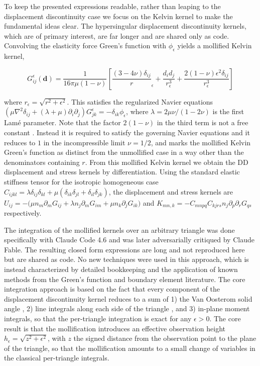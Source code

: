\documentclass[12pt]{article}
\newcommand{\ve}[1]{\mathbf{#1}}
\newcommand{\eps}{\epsilon}
\newcommand{\Req}{r_{\eps}}
\newcommand{\del}{\delta}
\begin{document}
To keep the presented expressions readable, rather than leaping to the displacement discontinuity case we focus on the Kelvin kernel to make the fundamental ideas clear.  The hypersingular displacement discontinuity kernels, which are of primary interest, are far longer and are shared only as code.  Convolving the elasticity force Green's function with $\phi_\eps$ yields a mollified Kelvin kernel,

\begin{equation}
  G_{ij}^\eps(\ve d)
    = \frac{1}{16\pi\mu(1-\nu)}
      \left[ \frac{(3-4 \nu) \del_{ij}} \Req
           + \frac{d_i d_j}{\Req^3}
           + \frac{2(1-\nu) \eps^2 \del_{ij}}{\Req^3} \right]
\end{equation}

where $\Req=\sqrt{r^2+\eps^2}$.  This satisfies the regularized Navier equations $(\mu\nabla^{2}\del_{ij} + (\lambda+\mu)\partial_i\partial_j) G^{\eps}_{jk} = -\del_{ik} \phi_\eps$, where $\lambda = 2\mu\nu/(1-2\nu)$ is the first Lam\'e parameter. Note that the factor $2(1-\nu)$ in the third term is not a free constant \citep{CortezFauciMedovikov2005}. Instead it is required to satisfy the governing Navier equations and it reduces to $1$ in the incompressible limit $\nu=1/2$, and marks the mollified Kelvin Green's function as distinct from the unmollified case in a way other than the denominators containing $r$.  From this mollified Kelvin kernel we obtain the DD displacement and stress kernels by differentiation. Using the standard elastic stiffness tensor for the isotropic homogeneous case $C_{ijkl}=\lambda\del_{ij}\del_{kl}+\mu(\del_{ik}\del_{jl}+\del_{il}\del_{jk})$, the displacement and stress kernels are $U_{ij} = -\bigl( \mu n_m \partial_m G_{ij} + \lambda n_j \partial_m G_{im} + \mu n_k \partial_j G_{ik} \bigr)$ and $K_{mn,k} = -C_{mnpq} C_{kjrs}n_j \partial_p \partial_r G_{qs}$ respectively. 

The integration of the mollified kernels over an arbitrary triangle was done specifically with Claude Code 4.6 and was later adversarially critiqued by Claude Fable.  The resulting closed form expressions are long and not reproduced here but are shared as code.  No new techniques were used in this approach, which is instead characterized by detailed bookkeeping and the application of known methods from the Green's function and boundary element literature.  The core integration approach is based on the fact that every component of the displacement discontinuity kernel reduces to a sum of 1) the Van Oosterom solid angle \citep{VanOosteromStrackee1983}, 2) line integrals along each side of the triangle \citep[e.g.,][]{yoffe1960angular, ComninouDundurs1975}, and 3) in-plane moment integrals, so that the per-triangle integration is exact for any $\eps>0$. The core result is that the mollification introduces an effective observation height $h_\eps = \sqrt{z^{2}+\eps^{2}}$, with $z$ the signed distance from the observation point to the plane of the triangle, so that the mollification amounts to a small change of variables in the classical per-triangle integrals.
\end{document}
